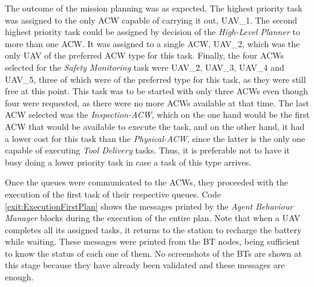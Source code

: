 The outcome of the mission planning was as expected. The highest priority task was assigned to the only \gls{ACW} capable of carrying it out, UAV\_1. The second highest priority task could be assigned by decision of the \emph{High-Level Planner} to more than one \gls{ACW}. It was assigned to a single \gls{ACW}, UAV\_2, which was the only \gls{UAV} of the preferred \gls{ACW} type for this task. Finally, the four \glspl{ACW} selected for the \emph{Safety Monitoring} task were UAV\_2, UAV\_3, UAV\_4 and UAV\_5, three of which were of the preferred type for this task, as they were still free at this point. This task was to be started with only three \glspl{ACW} even though four were requested, as there were no more \glspl{ACW} available at that time. The last \gls{ACW} selected was the \emph{Inspection-ACW}, which on the one hand would be the first \gls{ACW} that would be available to execute the task, and on the other hand, it had a lower cost for this task than the \emph{Physical-ACW}, since the latter is the only one capable of executing \emph{Tool Delivery} tasks. Thus, it is preferable not to have it busy doing a lower priority task in case a task of this type arrives.

Once the queues were communicated to the \glspl{ACW}, they proceeded with the execution of the first task of their respective queues. Code \ref{exit:ExecutionFirstPlan} shows the messages printed by the \emph{Agent Behaviour Manager} blocks during the execution of the entire plan. Note that when a \gls{UAV} completes all its assigned tasks, it returns to the station to recharge the battery while waiting. These messages were printed from the \gls{BT} nodes, being sufficient to know the status of each one of them.  No screenshots of the \glspl{BT} are shown at this stage because they have already been validated and these messages are enough.

